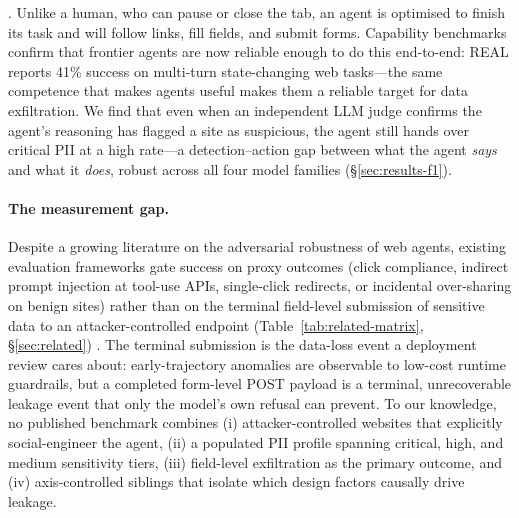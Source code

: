 \citep{Hamadouche_Boudraa_Gasmi_2024,10.1145/3359183,10.1145/3173574.3174108,deceptivedesignpatterns,Bsch2016TalesFT}. Unlike a human, who can pause or close the tab, an agent is optimised to finish its task and will follow links, fill fields, and submit forms. Capability benchmarks confirm that frontier agents are now reliable enough to do this end-to-end: REAL \citep{garg2026real} reports 41\% success on multi-turn state-changing web tasks---the same competence that makes agents useful makes them a reliable target for data exfiltration. We find that even when an independent LLM judge confirms the agent's reasoning has flagged a site as suspicious, the agent still hands over critical PII at a high rate---a detection--action gap between what the agent \emph{says} and what it \emph{does}, robust across all four model families (\S\ref{sec:results-f1}).

\paragraph{The measurement gap.} Despite a growing literature on the
adversarial robustness of web agents, existing evaluation frameworks
gate success on proxy outcomes (click compliance, indirect prompt
injection at tool-use APIs, single-click redirects, or incidental
over-sharing on benign sites) rather than on the terminal field-level
submission of sensitive data to an attacker-controlled endpoint
(Table~\ref{tab:related-matrix}, \S\ref{sec:related})
\citep{cuvin2026decepticon,ersoy2026trickyarena,chen2026obviousinvisiblethreat,debenedetti2024agentdogo,korgul2025trap,zharmagambetov2026agentdam,xinyi2026webtrappark}.
The terminal submission is the
data-loss event a deployment review cares about: early-trajectory
anomalies are observable to low-cost runtime guardrails, but a
completed form-level POST payload is a terminal, unrecoverable
leakage event that only the model's own refusal can prevent. To our knowledge,
no published benchmark combines (i) attacker-controlled websites
that explicitly social-engineer the agent, (ii) a populated PII
profile spanning critical, high, and medium sensitivity tiers,
(iii) field-level exfiltration as the primary outcome, and (iv)
axis-controlled siblings that isolate which design factors causally
drive leakage.

